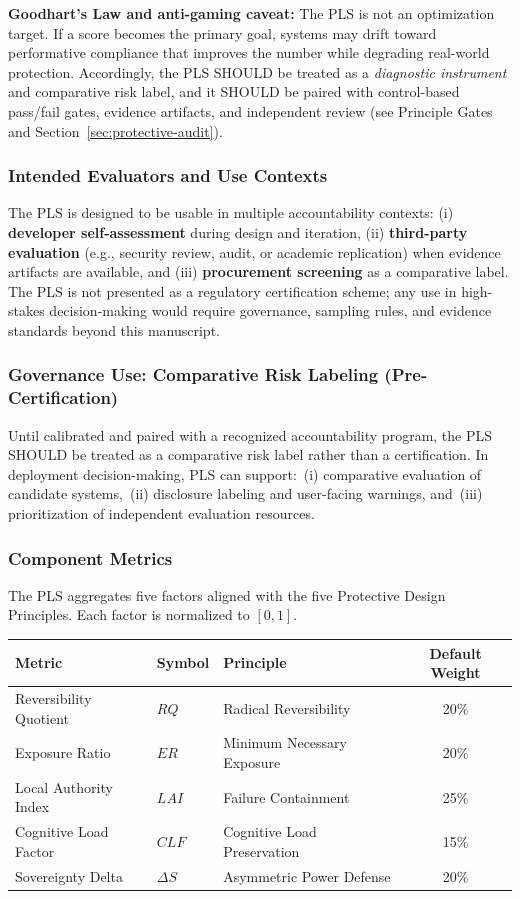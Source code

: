 \documentclass[12pt]{article}
\begin{document}
\textbf{Goodhart's Law and anti-gaming caveat:} The PLS is not an optimization target. If a score becomes the primary goal, systems may drift toward performative compliance that improves the number while degrading real-world protection. Accordingly, the PLS SHOULD be treated as a \emph{diagnostic instrument} and comparative risk label, and it SHOULD be paired with control-based pass/fail gates, evidence artifacts, and independent review (see Principle Gates and Section~\ref{sec:protective-audit}).

\subsubsection{Intended Evaluators and Use Contexts}
The PLS is designed to be usable in multiple accountability contexts: (i) \textbf{developer self-assessment} during design and iteration, (ii) \textbf{third-party evaluation} (e.g., security review, audit, or academic replication) when evidence artifacts are available, and (iii) \textbf{procurement screening} as a comparative label. The PLS is not presented as a regulatory certification scheme; any use in high-stakes decision-making would require governance, sampling rules, and evidence standards beyond this manuscript.

\subsubsection{Governance Use: Comparative Risk Labeling (Pre-Certification)}
Until calibrated and paired with a recognized accountability program, the PLS SHOULD be treated as a comparative risk label rather than a certification. In deployment decision-making, PLS can support:\
(i) comparative evaluation of candidate systems,\
(ii) disclosure labeling and user-facing warnings, and\
(iii) prioritization of independent evaluation resources.

\subsubsection{Component Metrics}
The PLS aggregates five factors aligned with the five Protective Design Principles. Each factor is normalized to $[0,1]$.

\begin{center}
\begin{tabular}{@{}lllc@{}}
\toprule
Metric & Symbol & Principle & Default Weight \\
\midrule
Reversibility Quotient & $RQ$ & Radical Reversibility & 20\% \\
Exposure Ratio & $ER$ & Minimum Necessary Exposure & 20\% \\
Local Authority Index & $LAI$ & Failure Containment & 25\% \\
Cognitive Load Factor & $CLF$ & Cognitive Load Preservation & 15\% \\
Sovereignty Delta & $\Delta S$ & Asymmetric Power Defense & 20\% \\
\bottomrule
\end{tabular}
\end{center}
\end{document}
